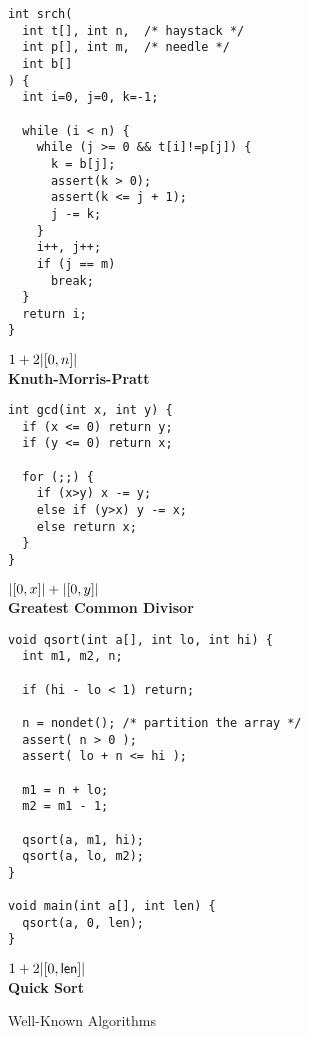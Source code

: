 \documentclass[nocopyrightspace,preprint]{sigplanconf}
\begin{document}
\begin{figure*}[t!]
 \setlength{\progwidth}{.32\linewidth}
  \centering
%
%
  \begin{minipage}[b]{\progwidth}
    \begin{center}
   \begin{lstlisting}
int srch(
  int t[], int n,  /* haystack */
  int p[], int m,  /* needle */
  int b[]
) {
  int i=0, j=0, k=-1;

  while (i < n) {
    while (j >= 0 && t[i]!=p[j]) {
      k = b[j];
      assert(k > 0);
      assert(k <= j + 1);
      j -= k;
    }
    i++, j++;
    if (j == m)
      break;
  }
  return i;
}
   \end{lstlisting}

$1 + 2|[0,n]|$
\\[.7\baselineskip]
      {\bf Knuth-Morris-Pratt}
    \end{center}
  \end{minipage}
%
%
  \begin{minipage}[b]{\progwidth}
    \begin{center}
   \begin{lstlisting}
int gcd(int x, int y) {
  if (x <= 0) return y;
  if (y <= 0) return x;

  for (;;) {
    if (x>y) x -= y;
    else if (y>x) y -= x;
    else return x;
  }
}
   \end{lstlisting}

$|[0,x]| + |[0,y]|$
\\[.7\baselineskip]
      {\bf Greatest Common Divisor}
    \end{center}
  \end{minipage}
%
%
  \begin{minipage}[b]{\progwidth}
    \begin{center}
   \begin{lstlisting}
void qsort(int a[], int lo, int hi) {
  int m1, m2, n;

  if (hi - lo < 1) return;

  n = nondet(); /* partition the array */
  assert( n > 0 );
  assert( lo + n <= hi );

  m1 = n + lo;
  m2 = m1 - 1;

  qsort(a, m1, hi);
  qsort(a, lo, m2);
}

void main(int a[], int len) {
  qsort(a, 0, len);
}
   \end{lstlisting}

$1 + 2 |[0,\mathsf{len}]|$
\\[.7\baselineskip]
      {\bf Quick Sort}
    \end{center}
  \end{minipage}

   \caption{Well-Known Algorithms}
  \label{fig:cat3}
\end{figure*}
\end{document}
